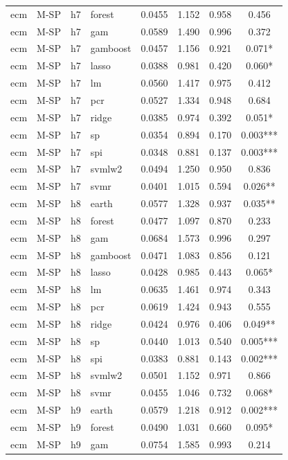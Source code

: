\begin{ThreePartTable}
\begin{longtable}[t]{llclcccc}
ecm & M-SP & h7 & forest & 0.0455 & 1.152 & 0.958 & 0.456\\
ecm & M-SP & h7 & gam & 0.0589 & 1.490 & 0.996 & 0.372\\
ecm & M-SP & h7 & gamboost & 0.0457 & 1.156 & 0.921 & 0.071*\\
ecm & M-SP & h7 & lasso & 0.0388 & 0.981 & 0.420 & 0.060*\\
ecm & M-SP & h7 & lm & 0.0560 & 1.417 & 0.975 & 0.412\\
ecm & M-SP & h7 & pcr & 0.0527 & 1.334 & 0.948 & 0.684\\
ecm & M-SP & h7 & ridge & 0.0385 & 0.974 & 0.392 & 0.051*\\
ecm & M-SP & h7 & sp & 0.0354 & 0.894 & 0.170 & 0.003***\\
ecm & M-SP & h7 & spi & 0.0348 & 0.881 & 0.137 & 0.003***\\
ecm & M-SP & h7 & svmlw2 & 0.0494 & 1.250 & 0.950 & 0.836\\
ecm & M-SP & h7 & svmr & 0.0401 & 1.015 & 0.594 & 0.026**\\
\addlinespace
ecm & M-SP & h8 & earth & 0.0577 & 1.328 & 0.937 & 0.035**\\
ecm & M-SP & h8 & forest & 0.0477 & 1.097 & 0.870 & 0.233\\
ecm & M-SP & h8 & gam & 0.0684 & 1.573 & 0.996 & 0.297\\
ecm & M-SP & h8 & gamboost & 0.0471 & 1.083 & 0.856 & 0.121\\
ecm & M-SP & h8 & lasso & 0.0428 & 0.985 & 0.443 & 0.065*\\
ecm & M-SP & h8 & lm & 0.0635 & 1.461 & 0.974 & 0.343\\
ecm & M-SP & h8 & pcr & 0.0619 & 1.424 & 0.943 & 0.555\\
ecm & M-SP & h8 & ridge & 0.0424 & 0.976 & 0.406 & 0.049**\\
ecm & M-SP & h8 & sp & 0.0440 & 1.013 & 0.540 & 0.005***\\
ecm & M-SP & h8 & spi & 0.0383 & 0.881 & 0.143 & 0.002***\\
ecm & M-SP & h8 & svmlw2 & 0.0501 & 1.152 & 0.971 & 0.866\\
ecm & M-SP & h8 & svmr & 0.0455 & 1.046 & 0.732 & 0.068*\\
\addlinespace
ecm & M-SP & h9 & earth & 0.0579 & 1.218 & 0.912 & 0.002***\\
ecm & M-SP & h9 & forest & 0.0490 & 1.031 & 0.660 & 0.095*\\
ecm & M-SP & h9 & gam & 0.0754 & 1.585 & 0.993 & 0.214\\

\end{longtable}
\end{ThreePartTable}
